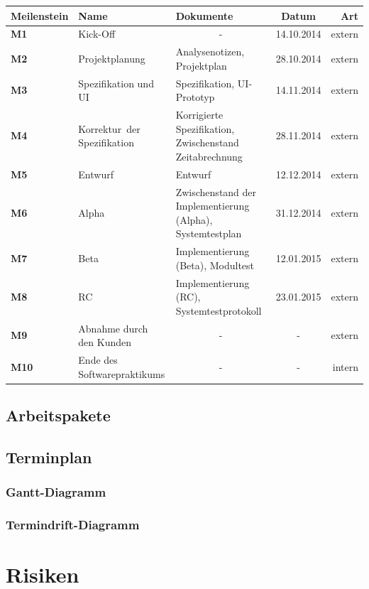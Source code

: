 \documentclass[11pt]{article}
\begin{document}
\begin{tabular}{|l|p{3.5cm}|p{3.5cm}|c|r|}
	\hline
	Meilenstein & Name & Dokumente & Datum & Art \\
	\hline \hline
	\textbf{M1} & Kick-Off & \multicolumn{1}{|c|}{-} & 14.10.2014 & extern \\
	\hline
	\textbf{M2} & Projektplanung & Analysenotizen, Projektplan & 28.10.2014 & extern \\
	\hline
	\textbf{M3} & Spezifikation und UI & Spezifikation, \mbox{UI-Prototyp} & 14.11.2014 & extern \\
	\hline
	\textbf{M4} & \mbox{Korrektur der} Spezifikation & Korrigierte Spezifikation, Zwischenstand Zeitabrechnung & 28.11.2014 & extern \\
	\hline
	\textbf{M5} & Entwurf & Entwurf & 12.12.2014 & extern \\
	\hline
	\textbf{M6} & Alpha & Zwischenstand der Implementierung (Alpha), Systemtestplan & 31.12.2014 & extern \\
	\hline
	\textbf{M7} & Beta & Implementierung (Beta), Modultest & 12.01.2015 & extern \\
	\hline
	\textbf{M8} & RC & Implementierung (RC), Systemtestprotokoll & 23.01.2015 & extern \\
	\hline
	\textbf{M9} & Abnahme durch den Kunden & \multicolumn{1}{|c|}{-} & - & extern \\
	\hline
	\textbf{M10} & Ende des Softwarepraktikums & \multicolumn{1}{|c|}{-} & - & intern \\
	\hline
\end{tabular}

\subsection{Arbeitspakete}

\subsection{Terminplan}

\subsubsection{Gantt-Diagramm}

\subsubsection{Termindrift-Diagramm}

\section{Risiken}
\end{document}

